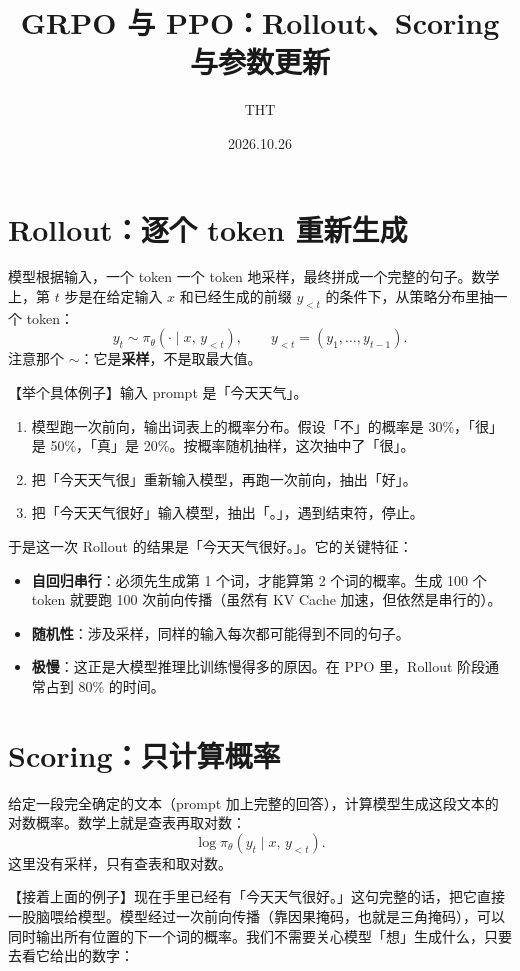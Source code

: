 \documentclass[UTF8,fontset=fandol]{ctexart}
\title{GRPO 与 PPO：Rollout、Scoring 与参数更新}
\author{THT}
\date{2026.10.26}
\begin{document}
\maketitlecolored

\section{Rollout：逐个 token 重新生成}

模型根据输入，一个 token 一个 token 地采样，最终拼成一个完整的句子。数学上，第 $t$ 步是在给定输入 $x$ 和已经生成的前缀 $y_{<t}$ 的条件下，从策略分布里抽一个 token：
\[
y_t \sim \pi_\theta(\cdot \mid x,\, y_{<t}),
\qquad
y_{<t} = (y_1, \dots, y_{t-1}).
\]
注意那个 $\sim$：它是\textbf{采样}，不是取最大值。

【举个具体例子】输入 prompt 是「今天天气」。

\begin{enumerate}
  \item 模型跑一次前向，输出词表上的概率分布。假设「不」的概率是 30\%，「很」是 50\%，「真」是 20\%。按概率随机抽样，这次抽中了「很」。
  \item 把「今天天气很」重新输入模型，再跑一次前向，抽出「好」。
  \item 把「今天天气很好」输入模型，抽出「。」，遇到结束符，停止。
\end{enumerate}

于是这一次 Rollout 的结果是「今天天气很好。」。它的关键特征：

\begin{itemize}
  \item \textbf{自回归串行}：必须先生成第 1 个词，才能算第 2 个词的概率。生成 100 个 token 就要跑 100 次前向传播（虽然有 KV Cache 加速，但依然是串行的）。
  \item \textbf{随机性}：涉及采样，同样的输入每次都可能得到不同的句子。
  \item \textbf{极慢}：这正是大模型推理比训练慢得多的原因。在 PPO 里，Rollout 阶段通常占到 80\% 的时间。
\end{itemize}

\section{Scoring：只计算概率}

给定一段完全确定的文本（prompt 加上完整的回答），计算模型生成这段文本的对数概率。数学上就是查表再取对数：
\[
\log \pi_\theta(y_t \mid x,\, y_{<t}).
\]
这里没有采样，只有查表和取对数。

【接着上面的例子】现在手里已经有「今天天气很好。」这句完整的话，把它直接一股脑喂给模型。模型经过一次前向传播（靠因果掩码，也就是三角掩码），可以同时输出所有位置的下一个词的概率。我们不需要关心模型「想」生成什么，只要去看它给出的数字：
\end{document}
